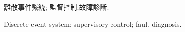 \documentclass{format/MUSTThesisC}
\begin{document}

\AddToShipoutPicture{\BackgroundPic}


\def\Ctitle 		{論文標題}
\def\Etitle 		{Thesis title}
\def\Sname 			{王茗琛}
\def\Sno 			{2230025907}
\def\Sfaculty 		{創新工程學院}
\def\Sprogram 		{智能技術碩士}
\def\Smajor 		{智能技術碩士}
\def\Ssupervisor	{劉新}
\def\Sdate			{YYYY/MM/DD}

\mustTitle



\mustCabstract
{
	
}
{離散事件繫統; 監督控制;故障診斷.}



\mustEabstract
{
	
}
{Discrete event system; supervisory control; fault diagnosis.}








\mustcontents





\listfigures
{
	
}
{}

\listtables
{
	
}
{}




\listsymbols
{
	
}
{}




\listabbreviations
{
	
}
{}














\linespread{1.3}\selectfont
\end{document}
